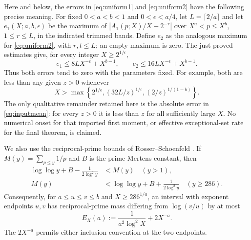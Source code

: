 \documentclass[10pt]{article}
\theoremstyle{remark}
\begin{document}
Here and below, the errors in \eqref{eq:uniform1} and
\eqref{eq:uniform2} have the following precise meaning. For fixed $0<a<b<1$
and $0<\epsilon<a/4$, let $L=\lceil2/a\rceil$ and let
$e_1(X;a,b,\epsilon)$ be the maximum of
$|A_1(p;X)/X-2^{-r}|$ over $X^a<p\leq X^b$, $1\leq r\leq L$, in
the indicated trimmed bands. Define $e_2$ as the analogous maximum for
\eqref{eq:uniform2}, with $r,t\leq L$; an empty maximum is zero.
The just-proved estimates give, for every integer $X\geq2^{1/\epsilon}$,
\[
 e_1\leq8LX^{-\epsilon}+X^{b-1},\qquad
 e_2\leq16LX^{-\epsilon}+X^{b-1}.
\]
Thus both errors tend to zero with the parameters fixed. For example,
both are less than any given $z>0$ whenever
\[
 X>\max\left\{2^{1/\epsilon},(32L/z)^{1/\epsilon},
                                  (2/z)^{1/(1-b)}\right\}.
\]
The only qualitative remainder retained here is the absolute error in
\eqref{eq:inputmean}: for every $z>0$ it is less than $z$ for all
sufficiently large $X$. No numerical onset for that imported first
moment, or effective exceptional-set rate for the final theorem, is
claimed.

We also use the reciprocal-prime bounds of Rosser--Schoenfeld
\cite{RS}. If $M(y)=\sum_{p\leq y}1/p$ and $B$ is the prime Mertens
constant, then
\begin{equation}\label{eq:RS}
 \begin{aligned}
 \log\log y+B-\frac1{2\log^2y}&<M(y)\quad(y>1),\\
 M(y)&<\log\log y+B+\frac1{2\log^2y}\quad(y\geq286).
 \end{aligned}
\end{equation}
Consequently, for $a\leq u\leq v\leq b$ and $X\geq286^{1/a}$, an
interval with exponent endpoints $u,v$ has reciprocal-prime mass
differing from $\log(v/u)$ by at most
\begin{equation}\label{eq:MX}
 E_X(a):=\frac1{a^2\log^2X}+2X^{-a}.
\end{equation}
The $2X^{-a}$ permits either inclusion convention at the two endpoints.
\end{document}
